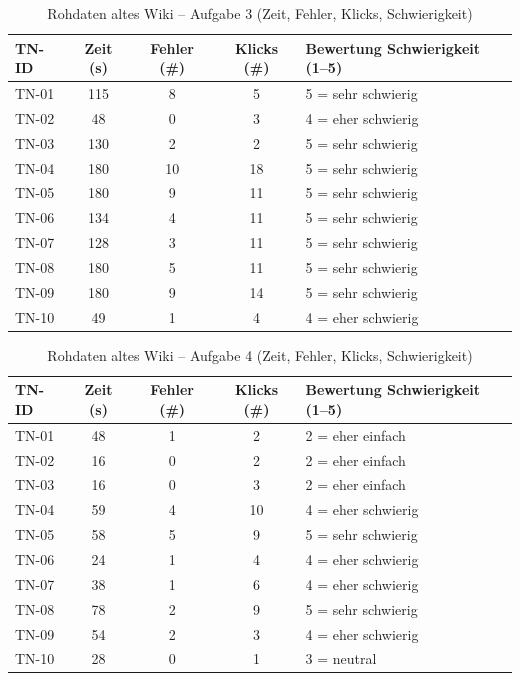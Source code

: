 \begin{table}[H]
\centering
\caption{Rohdaten altes Wiki -- Aufgabe 3 (Zeit, Fehler, Klicks, Schwierigkeit)}
\label{tab:BB-alt-task3}
\begin{tabularx}{\textwidth}{l c c c X}
\toprule
TN-ID & Zeit (s) & Fehler (\#) & Klicks (\#) & Bewertung Schwierigkeit (1--5) \\
\midrule
TN-01 & 115 & 8 & 5 & 5 = sehr schwierig \\
TN-02 & 48 & 0 & 3 & 4 = eher schwierig \\
TN-03 & 130 & 2 & 2 & 5 = sehr schwierig \\
TN-04 & 180 & 10 & 18 & 5 = sehr schwierig \\
TN-05 & 180 & 9 & 11 & 5 = sehr schwierig \\
TN-06 & 134 & 4 & 11 & 5 = sehr schwierig \\
TN-07 & 128 & 3 & 11 & 5 = sehr schwierig \\
TN-08 & 180 & 5 & 11 & 5 = sehr schwierig \\
TN-09 & 180 & 9 & 14 & 5 = sehr schwierig \\
TN-10 & 49 & 1 & 4 & 4 = eher schwierig \\
\bottomrule
\end{tabularx}
\end{table}

\begin{table}[H]
\centering
\caption{Rohdaten altes Wiki -- Aufgabe 4 (Zeit, Fehler, Klicks, Schwierigkeit)}
\label{tab:BB-alt-task4}
\begin{tabularx}{\textwidth}{l c c c X}
\toprule
TN-ID & Zeit (s) & Fehler (\#) & Klicks (\#) & Bewertung Schwierigkeit (1--5) \\
\midrule
TN-01 & 48 & 1 & 2 & 2 = eher einfach \\
TN-02 & 16 & 0 & 2 & 2 = eher einfach \\
TN-03 & 16 & 0 & 3 & 2 = eher einfach \\
TN-04 & 59 & 4 & 10 & 4 = eher schwierig \\
TN-05 & 58 & 5 & 9 & 5 = sehr schwierig \\
TN-06 & 24 & 1 & 4 & 4 = eher schwierig \\
TN-07 & 38 & 1 & 6 & 4 = eher schwierig \\
TN-08 & 78 & 2 & 9 & 5 = sehr schwierig \\
TN-09 & 54 & 2 & 3 & 4 = eher schwierig \\
TN-10 & 28 & 0 & 1 & 3 = neutral \\
\bottomrule
\end{tabularx}
\end{table}

